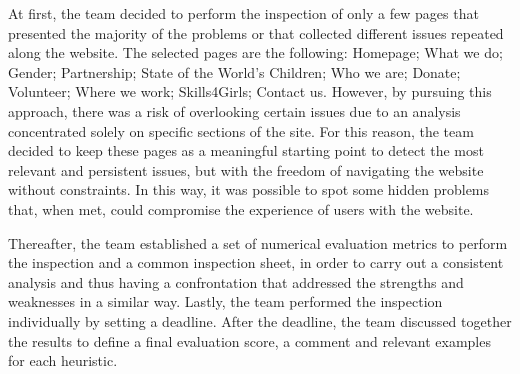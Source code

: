 At first, the team decided to perform the inspection of only a few pages that presented the majority of the problems or that collected different issues repeated along the website. The selected pages are the following: Homepage; What we do; Gender; Partnership; State of the World’s Children; Who we are; Donate; Volunteer; Where we work; Skills4Girls; Contact us.
However, by pursuing this approach, there was a risk of overlooking certain issues due to an analysis concentrated solely on specific sections of the site. For this reason, the team decided to keep these pages as a meaningful starting point to detect the most relevant and persistent issues, but with the freedom of navigating the website without constraints. In this way, it was possible to spot some hidden problems that, when met, could compromise the experience of users with the website.

Thereafter, the team established a set of numerical evaluation metrics to perform the inspection and a common inspection sheet, in order to carry out a consistent analysis and thus having a confrontation that addressed the strengths and weaknesses in a similar way.
Lastly, the team performed the inspection individually by setting a deadline. After the deadline, the team discussed together the results to define a final evaluation score, a comment and relevant examples for each heuristic.
\clearpage
